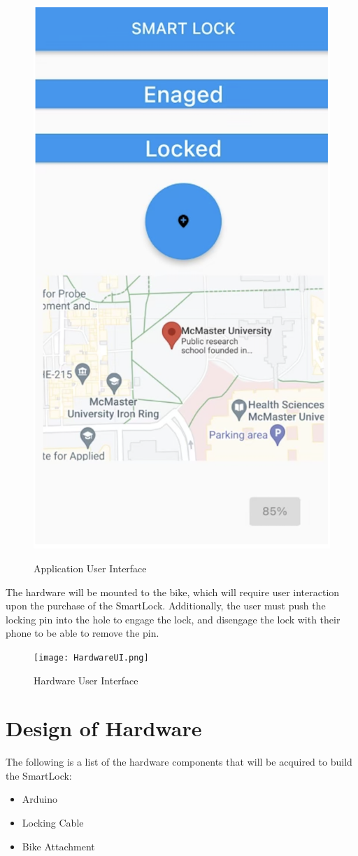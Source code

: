 \documentclass[12pt, titlepage]{article}
\begin{document}
 \begin{figure}[h!]
 \begin{center}
 {
  \includegraphics[width=0.5\linewidth]{UI.png}
 }
 \caption{\label{Application User Interface} Application User Interface}
 \end{center}
 \end{figure}

\newpage
The hardware will be mounted to the bike, which will require user interaction upon the purchase of the SmartLock. Additionally, the user must push the locking pin into the hole to engage the lock, and disengage the lock with their phone to be able to remove the pin. 

 \begin{figure}[h!]
 \begin{center}
 {
  \texttt{[image: HardwareUI.png]}
 }
 \caption{\label{Hardware User Interface} Hardware User Interface}
 \end{center}
 \end{figure}


\section{Design of Hardware}

The following is a list of the hardware components that will be acquired to build the SmartLock:
\begin{itemize}
\item Arduino
\item Locking Cable
\item Bike Attachment
\end{itemize}
\end{document}
